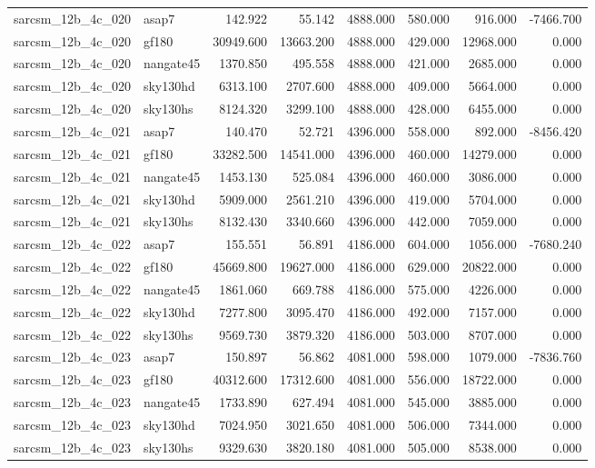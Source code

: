 \begin{tabular}{llrrrrrr}
sarcsm\_12b\_4c\_020 & asap7 & 142.922 & 55.142 & 4888.000 & 580.000 & 916.000 & -7466.700 \\
sarcsm\_12b\_4c\_020 & gf180 & 30949.600 & 13663.200 & 4888.000 & 429.000 & 12968.000 & 0.000 \\
sarcsm\_12b\_4c\_020 & nangate45 & 1370.850 & 495.558 & 4888.000 & 421.000 & 2685.000 & 0.000 \\
sarcsm\_12b\_4c\_020 & sky130hd & 6313.100 & 2707.600 & 4888.000 & 409.000 & 5664.000 & 0.000 \\
sarcsm\_12b\_4c\_020 & sky130hs & 8124.320 & 3299.100 & 4888.000 & 428.000 & 6455.000 & 0.000 \\
sarcsm\_12b\_4c\_021 & asap7 & 140.470 & 52.721 & 4396.000 & 558.000 & 892.000 & -8456.420 \\
sarcsm\_12b\_4c\_021 & gf180 & 33282.500 & 14541.000 & 4396.000 & 460.000 & 14279.000 & 0.000 \\
sarcsm\_12b\_4c\_021 & nangate45 & 1453.130 & 525.084 & 4396.000 & 460.000 & 3086.000 & 0.000 \\
sarcsm\_12b\_4c\_021 & sky130hd & 5909.000 & 2561.210 & 4396.000 & 419.000 & 5704.000 & 0.000 \\
sarcsm\_12b\_4c\_021 & sky130hs & 8132.430 & 3340.660 & 4396.000 & 442.000 & 7059.000 & 0.000 \\
sarcsm\_12b\_4c\_022 & asap7 & 155.551 & 56.891 & 4186.000 & 604.000 & 1056.000 & -7680.240 \\
sarcsm\_12b\_4c\_022 & gf180 & 45669.800 & 19627.000 & 4186.000 & 629.000 & 20822.000 & 0.000 \\
sarcsm\_12b\_4c\_022 & nangate45 & 1861.060 & 669.788 & 4186.000 & 575.000 & 4226.000 & 0.000 \\
sarcsm\_12b\_4c\_022 & sky130hd & 7277.800 & 3095.470 & 4186.000 & 492.000 & 7157.000 & 0.000 \\
sarcsm\_12b\_4c\_022 & sky130hs & 9569.730 & 3879.320 & 4186.000 & 503.000 & 8707.000 & 0.000 \\
sarcsm\_12b\_4c\_023 & asap7 & 150.897 & 56.862 & 4081.000 & 598.000 & 1079.000 & -7836.760 \\
sarcsm\_12b\_4c\_023 & gf180 & 40312.600 & 17312.600 & 4081.000 & 556.000 & 18722.000 & 0.000 \\
sarcsm\_12b\_4c\_023 & nangate45 & 1733.890 & 627.494 & 4081.000 & 545.000 & 3885.000 & 0.000 \\
sarcsm\_12b\_4c\_023 & sky130hd & 7024.950 & 3021.650 & 4081.000 & 506.000 & 7344.000 & 0.000 \\
sarcsm\_12b\_4c\_023 & sky130hs & 9329.630 & 3820.180 & 4081.000 & 505.000 & 8538.000 & 0.000 \\

\end{tabular}
